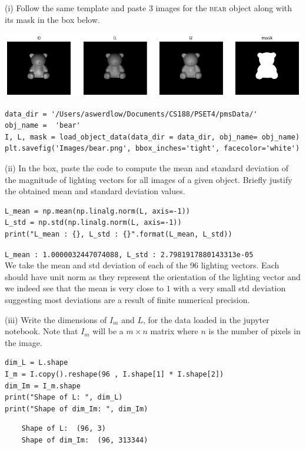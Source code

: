 \documentclass[answers]{exam}
\begin{document}
(i) Follow the same template and paste 3 images for the \textsc{bear} object along with its mask in the box below. \\ 
\begin{solution}
    \begin{center}
        \includegraphics[scale=0.45]{Images/bear.png}
    \end{center}
\begin{verbatim}
data_dir = '/Users/aswerdlow/Documents/CS188/PSET4/pmsData/'
obj_name =  'bear'
I, L, mask = load_object_data(data_dir = data_dir, obj_name= obj_name)
plt.savefig('Images/bear.png', bbox_inches='tight', facecolor='white')
\end{verbatim}
\end{solution}
(ii) In the box, paste the code to compute the mean and standard deviation of the magnitude of lighting vectors for all images of a given object. Briefly justify the obtained mean and standard deviation values. \\ 
\begin{solution}
\begin{verbatim}
L_mean = np.mean(np.linalg.norm(L, axis=-1))
L_std = np.std(np.linalg.norm(L, axis=-1))
print("L_mean : {}, L_std : {}".format(L_mean, L_std))
\end{verbatim}

\texttt{L\_mean : 1.0000032447074088, L\_std : 2.7981917880143313e-05} \\

We take the mean and std deviation of each of the 96 lighting vectors. Each should have unit norm as they represent the orientation of the lighting vector and we indeed see that the mean is very close to 
$1$ with a very small std deviation suggesting most deviations are a result of finite numerical precision.

\end{solution}
(iii) Write the dimensions of $I_{m}$ and $L$, for the data loaded in the jupyter notebook. Note that $I_{m}$ will be a $m \times n$ matrix where $n$ is the number of pixels in the image. 
\begin{solution}
\begin{verbatim}
dim_L = L.shape
I_m = I.copy().reshape(96 , I.shape[1] * I.shape[2])
dim_Im = I_m.shape
print("Shape of L: ", dim_L)
print("Shape of dim_Im: ", dim_Im)
\end{verbatim}
\begin{verbatim}
    Shape of L:  (96, 3)
    Shape of dim_Im:  (96, 313344)
\end{verbatim}
\end{solution}
\end{document}

